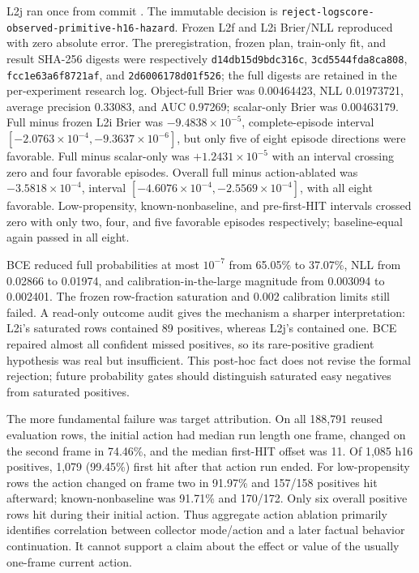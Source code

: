 \documentclass[11pt]{article}
\begin{document}
L2j ran once from commit
.  The immutable decision is
\texttt{reject-logscore-observed-primitive-h16-hazard}.  Frozen L2f and L2i
Brier/NLL reproduced with zero absolute error.  The preregistration, frozen
plan, train-only fit, and result SHA-256 digests were respectively
\texttt{d14db15d9bdc316c}, \texttt{3cd5544fda8ca808},
\texttt{fcc1e63a6f8721af}, and \texttt{2d6006178d01f526}; the full digests are
retained in the per-experiment research log.  Object-full Brier was
0.00464423, NLL 0.01973721, average precision 0.33083, and AUC 0.97269;
scalar-only Brier was 0.00463179.  Full minus frozen L2i Brier was
$-9.4838\times10^{-5}$, complete-episode interval
$[-2.0763\times10^{-4},-9.3637\times10^{-6}]$, but only five of eight episode
directions were favorable.  Full minus scalar-only was
$+1.2431\times10^{-5}$ with an interval crossing zero and four favorable
episodes.  Overall full minus action-ablated was
$-3.5818\times10^{-4}$, interval
$[-4.6076\times10^{-4},-2.5569\times10^{-4}]$, with all eight favorable.
Low-propensity, known-nonbaseline, and pre-first-HIT intervals crossed zero
with only two, four, and five favorable episodes respectively; baseline-equal
again passed in all eight.

BCE reduced full probabilities at most $10^{-7}$ from 65.05\% to 37.07\%, NLL
from 0.02866 to 0.01974, and calibration-in-the-large magnitude from 0.003094
to 0.002401.  The frozen row-fraction saturation and 0.002 calibration limits
still failed.  A read-only outcome audit gives the mechanism a sharper
interpretation: L2i's saturated rows contained 89 positives, whereas L2j's
contained one.  BCE repaired almost all confident missed positives, so its
rare-positive gradient hypothesis was real but insufficient.  This post-hoc
fact does not revise the formal rejection; future probability gates should
distinguish saturated easy negatives from saturated positives.

The more fundamental failure was target attribution.  On all 188,791 reused
evaluation rows, the initial action had median run length one frame, changed on
the second frame in 74.46\%, and the median first-HIT offset was 11.  Of 1,085
h16 positives, 1,079 (99.45\%) first hit after that action run ended.  For
low-propensity rows the action changed on frame two in 91.97\% and 157/158
positives hit afterward; known-nonbaseline was 91.71\% and 170/172.  Only six
overall positive rows hit during their initial action.  Thus aggregate action
ablation primarily identifies correlation between collector mode/action and a
later factual behavior continuation.  It cannot support a claim about the
effect or value of the usually one-frame current action.
\end{document}
